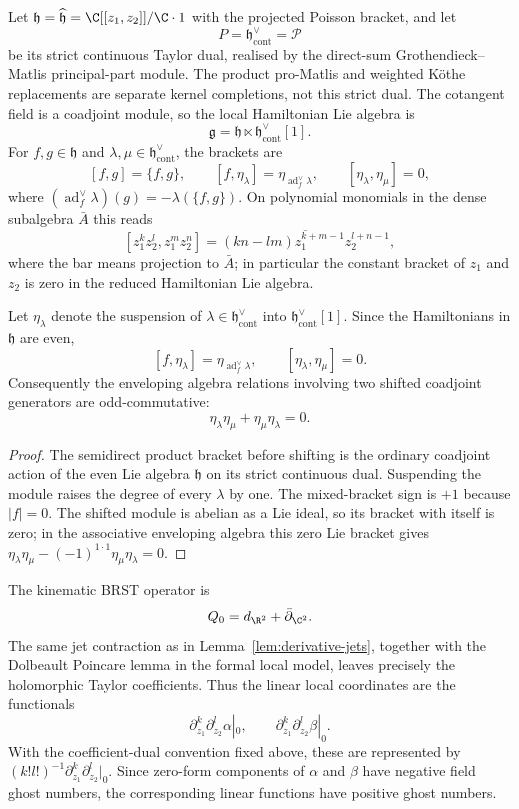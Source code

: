 \documentclass[11pt]{memoir}
\begin{document}
Let $\mathfrak h=\widehat{\mathfrak h}=\C[[z_1,z_2]]/\C\cdot1$ with the
projected Poisson bracket, and let
\[
  P=\mathfrak h^\vee_{\mathrm{cont}}=\mathcal P
\]
be its strict continuous Taylor dual, realised by the direct-sum
Grothendieck--Matlis principal-part module.  The product pro-Matlis and
weighted K\"othe replacements are separate kernel completions, not this
strict dual.  The cotangent field is a coadjoint module, so the local
Hamiltonian Lie algebra is
$$\mathfrak g=\mathfrak h\ltimes\mathfrak h^\vee_{\mathrm{cont}}[1].$$
For $f,g\in\mathfrak h$ and
$\lambda,\mu\in\mathfrak h^\vee_{\mathrm{cont}}$, the brackets are
$$[f,g]=\{f,g\},\qquad [f,\eta_\lambda]=\eta_{\operatorname{ad}^{\vee}_f\lambda},
  \qquad [\eta_\lambda,\eta_\mu]=0,$$
where $(\operatorname{ad}^{\vee}_f\lambda)(g)=-\lambda(\{f,g\})$.
On polynomial monomials in the dense subalgebra $\bar A$ this reads
$$[z_1^kz_2^l,z_1^mz_2^n]
  =\overline{(kn-lm)z_1^{k+m-1}z_2^{l+n-1}},$$
where the bar means projection to $\bar A$; in particular the constant bracket
of $z_1$ and $z_2$ is zero in the reduced Hamiltonian Lie algebra.

\begin{lem}\label{lem:shifted-coadjoint-signs}
  Let $\eta_\lambda$ denote the suspension of
  $\lambda\in\mathfrak h^\vee_{\mathrm{cont}}$ into
  $\mathfrak h^\vee_{\mathrm{cont}}[1]$. Since the Hamiltonians in
  $\mathfrak h$ are even,
  $$[f,\eta_\lambda]=\eta_{\operatorname{ad}^{\vee}_f\lambda},\qquad
    [\eta_\lambda,\eta_\mu]=0.$$
  Consequently the enveloping algebra relations involving two shifted
  coadjoint generators are odd-commutative:
  $$\eta_\lambda\eta_\mu+\eta_\mu\eta_\lambda=0.$$
\end{lem}

\begin{proof}
  The semidirect product bracket before shifting is the ordinary coadjoint
  action of the even Lie algebra $\mathfrak h$ on its strict continuous
  dual. Suspending the module raises the degree of every $\lambda$ by one. The mixed-bracket sign
  is $+1$ because $|f|=0$. The shifted module is
  abelian as a Lie ideal, so its bracket with itself is zero; in the associative
  enveloping algebra this zero Lie bracket gives
  $\eta_\lambda\eta_\mu-(-1)^{1\cdot1}\eta_\mu\eta_\lambda=0$.
\end{proof}

The kinematic BRST operator is
$$Q_0=d_{\R^2}+\bar\partial_{\C^2}.$$
The same jet contraction as in Lemma~\ref{lem:derivative-jets}, together with
the Dolbeault Poincare lemma in the formal local model, leaves precisely the
holomorphic Taylor coefficients. Thus the linear local coordinates are the
functionals
$$\partial_{z_1}^k\partial_{z_2}^l\alpha|_0,\qquad
  \partial_{z_1}^k\partial_{z_2}^l\beta|_0.$$
With the coefficient-dual convention fixed above, these are represented by
$(k!l!)^{-1}\partial_{z_1}^k\partial_{z_2}^l|_0$. Since zero-form components of
$\alpha$ and $\beta$ have negative field ghost numbers, the corresponding
linear functions have positive ghost numbers.
\end{document}
